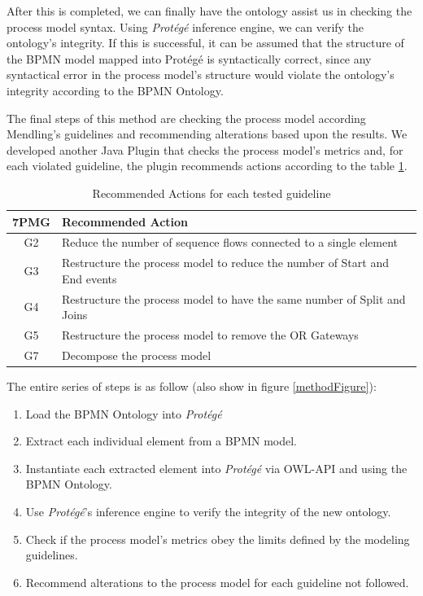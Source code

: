 \documentclass[a4paper,twoside]{article}
\begin{document}
After this is completed, we can finally have the ontology assist us in checking the process model syntax.  Using \textit{Protégé} inference engine, we can verify the ontology's integrity. If this is successful, it can be assumed that the structure of the BPMN model mapped into Protégé is syntactically correct, since any syntactical error in the process model's structure would violate the ontology's integrity according to the BPMN Ontology.

The final steps of this method are checking the process model according Mendling's guidelines and recommending alterations based upon the results. We developed another Java Plugin that checks the process model's metrics and, for each violated guideline, the plugin recommends actions according to the table \ref{RecommendedActions}.

\begin{table}[]
	\centering
	\caption{Recommended Actions for each tested guideline}
	\label{RecommendedActions}
	\begin{tabular}{|c|p{5.5cm}|}
		\hline
		7PMG & Recommended Action \\ \hline
		G2 & Reduce the number of sequence flows connected to a single element \\ \hline
		G3 & Restructure the process model to reduce the number of Start and End events \\ \hline
		G4 & Restructure the process model to have the same number of Split and Joins \\ \hline
		G5 & Restructure the process model to remove the OR Gateways \\ \hline
		G7 & Decompose the process model \\ \hline
	\end{tabular}
\end{table}

The entire series of steps is as follow (also show in figure \ref{methodFigure}):

\begin{enumerate}
	\item Load the BPMN Ontology into \textit{Protégé}
	\item Extract each individual element from a BPMN model.
	\item Instantiate each extracted element into \textit{Protégé} via OWL-API and using the BPMN Ontology.
	\item Use \textit{Protégé}'s inference engine to verify the integrity of the new ontology.
	\item Check if the process model's metrics obey the limits defined by the modeling guidelines.
	\item Recommend alterations to the process model for each guideline not followed.
\end{enumerate}
\end{document}
